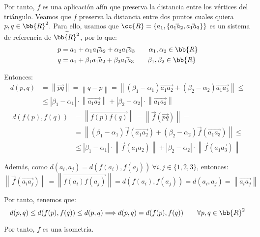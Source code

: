 \begin{ejercicio}
\begin{enumerate}
\begin{description}
            Por tanto, $f$ es una aplicación afín que preserva la distancia entre los vértices del triángulo.
            Veamos que $f$ preserva la distancia entre dos puntos cuales quiera
            $p,q\in \bb{R}^2$. Para ello, usamos que $\cc{R}=\left\{a_1, \left\{\vec{a_1a_2}, \vec{a_1a_3}\right\}\right\}$ es un sistema de referencia de $\vec{\bb{R}^2}$, por lo que:
            \begin{align*}
                p &= a_1 + \alpha_1\vec{a_1a_2} + \alpha_2\vec{a_1a_3} \qquad \alpha_1,\alpha_2\in \bb{R}
                \\
                q &= a_1 + \beta_1\vec{a_1a_2} + \beta_2\vec{a_1a_3} \qquad \beta_1,\beta_2\in \bb{R}
            \end{align*}

            Entonces:
            \begin{align*}
                d(p,q) &= \left\|\vec{pq}\right\| = \left\|q-p\right\| = \left\|(\beta_1-\alpha_1)\vec{a_1a_2} + (\beta_2-\alpha_2)\vec{a_1a_3}\right\|
                \leq\\&\leq  |\beta_1-\alpha_1|\cdot \left\|\vec{a_1a_2}\right\| + |\beta_2-\alpha_2|\cdot \left\|\vec{a_1a_3}\right\|
            \end{align*}
            \begin{align*}
                d(f(p),f(q)) &= \left\|\vec{f(p)f(q)}\right\| = \left\|\vec{f}\left(\vec{pq}\right)\right\|
                =\\&= \left\|(\beta_1-\alpha_1)\vec{f}\left(\vec{a_1a_2}\right) + (\beta_2-\alpha_2)\vec{f}\left(\vec{a_1a_3}\right)\right\|
                \leq\\&\leq  |\beta_1-\alpha_1|\cdot \left\|\vec{f}\left(\vec{a_1a_2}\right)\right\| + |\beta_2-\alpha_2|\cdot \left\|\vec{f}\left(\vec{a_1a_3}\right)\right\|
            \end{align*}

            Además, como $d(a_i,a_j)=d(f(a_i),f(a_j))~\forall i,j\in \{1,2,3\}$, entonces:
            \begin{equation*}
                \left\|\vec{f}\left(\vec{a_ia_j}\right)\right\| = \left\|\vec{f(a_i)f(a_j)}\right\| = d(f(a_i),f(a_j)) = d(a_i,a_j) = \left\|\vec{a_ia_j}\right\|
            \end{equation*}

            Por tanto, tenemos que:
            \begin{equation*}
                d(p, q) \leq d(f(p), f(q)) \leq d(p, q) \Longrightarrow d(p,q) = d(f(p),f(q)) \qquad \forall p,q\in \bb{R}^2
            \end{equation*}

            Por tanto, $f$ es una isometría.
        \end{description}
    \end{enumerate}
\end{ejercicio}

